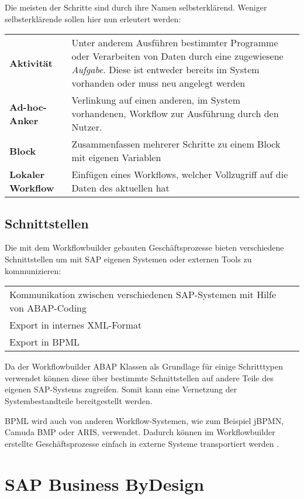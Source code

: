 \documentclass{handout}
\begin{document}
Die meisten der Schritte sind durch ihre Namen selbsterklärend. Weniger selbsterklärende sollen hier nun erleutert werden:

\small
\begin{tabular}{l p{13 cm}}
\textbf{Aktivität} & Unter anderem Ausführen bestimmter Programme oder Verarbeiten von Daten durch eine zugewiesene \textit{Aufgabe}. Diese ist entweder bereits im System vorhanden oder muss neu angelegt werden\\
\textbf{Ad-hoc-Anker} & Verlinkung auf einen anderen, im System vorhandenen, Workflow zur Ausführung durch den Nutzer.\\
\textbf{Block} & Zusammenfassen mehrerer Schritte zu einem Block mit eigenen Variablen\\
\textbf{Lokaler Workflow} & Einfügen eines Workflows, welcher Vollzugriff auf die Daten des aktuellen hat\\
\end{tabular}
\normalsize

\subsection{Schnittstellen}

Die mit dem Workflowbuilder gebauten Geschäftsprozesse bieten verschiedene Schnittstellen um mit SAP eigenen Systemen oder externen Tools zu kommunizieren:

\small
\begin{tabular}{L l}
Kommunikation zwischen verschiedenen SAP-Systemen mit Hilfe von ABAP-Coding\\
Export in internes XML-Format\\
Export in BPML\\
\end{tabular}
\normalsize

Da der Workflowbuilder ABAP Klassen als Grundlage für einige Schritttypen verwendet können diese über bestimmte Schnittstellen auf andere Teile des eigenen SAP-Systems zugreifen. Somit kann eine Vernetzung der Systembestandteile bereitgestellt werden.

BPML wird auch von anderen Workflow-Systemen, wie zum Beispiel jBPMN, Camuda BMP oder ARIS, verwendet. Dadurch können im Workflowbuilder erstellte Geschäftsprozesse einfach in externe Systeme transportiert werden \cite{BPML}.

\section{SAP Business ByDesign}
\end{document}
